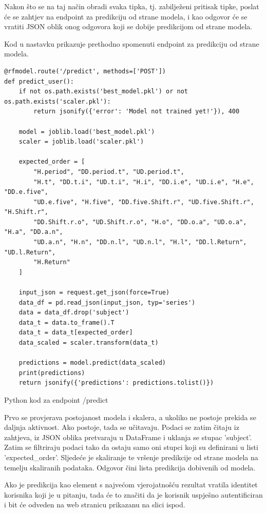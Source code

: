 \documentclass[]{foi}
\begin{document}
Nakon što se na taj način obradi svaka tipka, tj. zabilježeni pritisak tipke, poslat će se zahtjev na endpoint za predikciju od strane modela, i kao odgovor će se vratiti JSON oblik onog odgovora koji se dobije predikcijom od strane modela.

Kod u nastavku prikazuje prethodno spomenuti endpoint za predikciju od strane modela.

\begin{listing}
\begin{verbatim}
@rfmodel.route('/predict', methods=['POST'])
def predict_user():
    if not os.path.exists('best_model.pkl') or not os.path.exists('scaler.pkl'):
        return jsonify({'error': 'Model not trained yet!'}), 400

    model = joblib.load('best_model.pkl')
    scaler = joblib.load('scaler.pkl')

    expected_order = [
        "H.period", "DD.period.t", "UD.period.t", 
        "H.t", "DD.t.i", "UD.t.i", "H.i", "DD.i.e", "UD.i.e", "H.e", "DD.e.five", 
        "UD.e.five", "H.five", "DD.five.Shift.r", "UD.five.Shift.r", "H.Shift.r", 
        "DD.Shift.r.o", "UD.Shift.r.o", "H.o", "DD.o.a", "UD.o.a", "H.a", "DD.a.n", 
        "UD.a.n", "H.n", "DD.n.l", "UD.n.l", "H.l", "DD.l.Return", "UD.l.Return", 
        "H.Return"
    ]

    input_json = request.get_json(force=True) 
    data_df = pd.read_json(input_json, typ='series')
    data = data_df.drop('subject')
    data_t = data.to_frame().T
    data_t = data_t[expected_order]
    data_scaled = scaler.transform(data_t)

    predictions = model.predict(data_scaled)
    print(predictions)
    return jsonify({'predictions': predictions.tolist()})
\end{verbatim}
\caption{Python kod za endpoint /predict}
\label{lst:python_predict}
\end{listing}

Prvo se provjerava postojanost modela i skalera, a ukoliko ne postoje prekida se daljnja aktivnost. Ako postoje, tada se učitavaju. Podaci se zatim čitaju iz zahtjeva, iz JSON oblika pretvaraju u DataFrame i uklanja se stupac 'subject'. Zatim se filtriraju podaci tako da ostaju samo oni stupci koji su definirani u listi 'expected\_order'. Sljedeće je skaliranje te vršenje predikcije od strane modela na temelju skaliranih podataka. Odgovor čini lista predikcija dobivenih od modela.

Ako je predikcija kao element s najvećom vjerojatnošću rezultat vratila identitet korisnika koji je u pitanju, tada će to značiti da je korisnik uspješno autentificiran i bit će odveden na web stranicu prikazanu na slici ispod.
\end{document}
